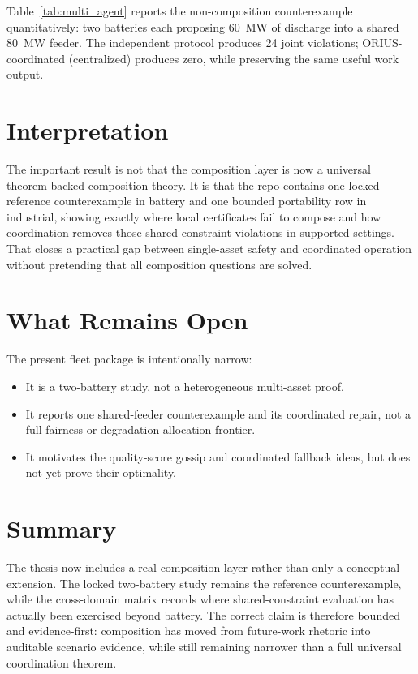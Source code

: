 Table~\ref{tab:multi_agent} reports the non-composition counterexample
quantitatively: two batteries each proposing 60~MW of discharge into a
shared 80~MW feeder.  The independent protocol produces 24 joint
violations; ORIUS-coordinated (centralized) produces zero, while
preserving the same useful work output.



\section{Interpretation}

The important result is not that the composition layer is now a universal theorem-backed
composition theory.  It is that the repo contains one locked reference
counterexample in battery and one bounded portability row in industrial,
showing exactly where local certificates fail to compose and how coordination
removes those shared-constraint violations in supported settings.  That
closes a practical gap between single-asset safety and coordinated operation
without pretending that all composition questions are solved.

\section{What Remains Open}

The present fleet package is intentionally narrow:

\begin{itemize}
  \item It is a two-battery study, not a heterogeneous multi-asset proof.
  \item It reports one shared-feeder counterexample and its coordinated repair,
    not a full fairness or degradation-allocation frontier.
  \item It motivates the quality-score gossip and coordinated fallback ideas,
    but does not yet prove their optimality.
\end{itemize}

\section{Summary}

The thesis now includes a real composition layer rather than only a
conceptual extension.  The locked two-battery study remains the reference
counterexample, while the cross-domain matrix records where shared-constraint
evaluation has actually been exercised beyond battery.  The correct claim is
therefore bounded and evidence-first: composition has moved from future-work
rhetoric into auditable scenario evidence, while still remaining narrower
than a full universal coordination theorem.
